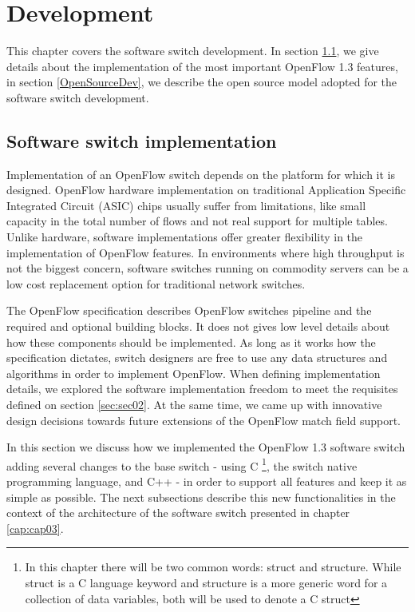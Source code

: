 \chapter{Development}
\label{cap:cap04}

This chapter covers the software switch development. In section \ref{softfeatures}, we give details about the implementation of the most important OpenFlow 1.3 features, in section \ref{OpenSourceDev}, we describe the open source model adopted for the software switch development. 

\section{Software switch implementation}
\label{softfeatures}

Implementation of an OpenFlow switch depends on the platform for which it is designed. OpenFlow hardware implementation on traditional Application Specific Integrated Circuit (ASIC) chips usually suffer from limitations, like small capacity in the total number of flows and not real support for multiple tables. Unlike hardware, software implementations offer greater flexibility in the implementation of OpenFlow features. In environments where high throughput is not the biggest concern, software switches running on commodity servers can be a low cost replacement option for traditional network switches.

The OpenFlow specification describes OpenFlow switches pipeline and the required and optional building blocks. It does not gives low level details about how these components should be implemented. As long as it works how the specification dictates, switch designers are free to use any data structures and algorithms in order to implement OpenFlow. When defining implementation details, we explored the software implementation freedom to meet the requisites defined on section \ref{sec:sec02}. At the same time, we came up with innovative design decisions towards future extensions of the OpenFlow match field support.  

In this section we discuss how we implemented the OpenFlow 1.3 software switch adding several changes to the base switch - using C \footnote{In this chapter there will be two common words: struct and structure. While struct is a C language keyword and structure is a more generic word for a collection of data variables, both will be used to denote a C struct}, the switch native programming language, and C++ - in order to support all features and keep it as simple as possible. The next subsections describe this new functionalities in the context of the architecture of the software switch presented in chapter \ref{cap:cap03}.


